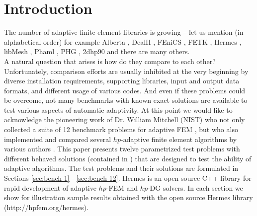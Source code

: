 \section{Introduction}
\label{sec:intro}

The number of adaptive finite element libraries is growing
-- let us mention (in alphabetical order) for example Alberta
\cite{alberta}, DealII \cite{dealii}, FEniCS
\cite{fenics}, FETK \cite{fetk}, Hermes \cite{hermes}, libMesh \cite{libmesh},
Phaml \cite{phaml}, PHG \cite{phg}, 2dhp90 \cite{2dhp90} and there are many others.\\
A natural question that arises is how do they compare to each other?
Unfortunately, comparison efforts are usually inhibited at the very beginning
by diverse installation requirements, supporting libraries, input and output
data formats, and different usage of various codes. And even if these problems
could be overcome, not many benchmarks with known exact solutions are
available to test various aspects of automatic adaptivity.
At this point we would like to acknowledge the pioneering work of Dr. William Mitchell
(NIST) who not only collected a suite of 12 benchmark problems
for adaptive FEM \cite{mitchell-1}, but who also implemented
and compared several $hp$-adaptive finite element algorithms by various
authors \cite{mitchell-2}.
This paper presents twelve parametrized test problems with different behaved
solutions (contained in \cite{mitchell-1}) that are
designed to test the ability of adaptive algorithms.
The test problems and their
solutions are formulated in Sections \ref{sec:bench-1} - \ref{sec:bench-12}.
{\sc Hermes} is an open source C++ library for
rapid development of adaptive $hp$-FEM and $hp$-DG solvers.
In each section we show for illustration sample results obtained with the open
source {\sc Hermes} library (http://hpfem.org/hermes).
